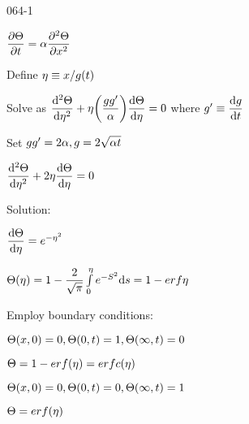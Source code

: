 \begin{mitframe}{064-1}
\begin{listone}
	\item $\dfrac{\partial\dimltemp}{\partial\timet}=\tdiff\dfrac{\partial^2\dimltemp}{\partial\disp^2}$
    \item Define $\intrinsvisc\equiv\disp/\grav(\timet)$
    \item Solve as $\dfrac{\mathrm{d}^2\dimltemp}{\mathrm{d}\intrinsvisc^2}+\intrinsvisc\bigg(\dfrac{\grav\grav'}{\tdiff}\bigg)\dfrac{\mathrm{d}\dimltemp}{\mathrm{d}\intrinsvisc}=0$ where $\grav'\equiv\dfrac{\mathrm{d}\grav}{\mathrm{d}\timet}$
    \item Set $\grav\grav'=2\tdiff, \grav=2\sqrt{\tdiff\timet}$
    \item $\dfrac{\mathrm{d}^2\dimltemp}{\mathrm{d}\intrinsvisc^2}+2\intrinsvisc\dfrac{\mathrm{d}\dimltemp}{\mathrm{d}\intrinsvisc}=0$
    \item Solution:
    	\begin{listtwo}
   			\item $\dfrac{\mathrm{d}\dimltemp}{\mathrm{d}\intrinsvisc}=\e^{-\intrinsvisc^2}$
            \item $\dimltemp(\intrinsvisc)=1-\dfrac{2}{\sqrt{\pi}}\int\limits_{\init}^{\intrinsvisc}\e^{-\entropy^2}\mathrm{d}s=1-erf{\intrinsvisc}$
        \end{listtwo}
       \item Employ boundary conditions:
       \begin{listtwo}
       		\item $\dimltemp(\disp,0)=0,\dimltemp(0,\timet)=1, \dimltemp(\infty,\timet)=0$
            	\begin{listthree}
                	\item $\dimltemp=1-erf(\intrinsvisc)=erfc(\intrinsvisc)$
                \end{listthree}
            \item $\dimltemp(\disp,0)=0, \dimltemp(0,\timet)=0, \dimltemp(\infty,\timet)=1$
       	\begin{listthree}
        	\item $\dimltemp=erf(\intrinsvisc)$
            
        \end{listthree}
       \end{listtwo}
\end{listone}    
\end{mitframe}
